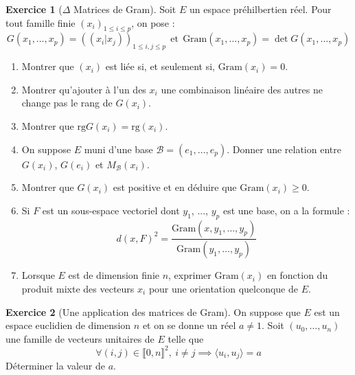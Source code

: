 \documentclass[french]{book}
\theoremstyle{definition}
\newtheorem{ex}{Exercice}[chapter]
\theoremstyle{theorem}
\theoremstyle{remark}
\begin{document}
\begin{ex}[$\Delta$ Matrices de Gram] Soit $E$ un espace préhilbertien réel. Pour tout famille finie $(x_i)_{1\leqslant i\leqslant p}$, on pose : $$G(x_1,\ldots,x_p)=((x_i|x_j))_{1\leqslant i,j\leqslant p}\ \ \text{et} \ \ \text{Gram}(x_1,\ldots,x_p)=\det G(x_1,\ldots,x_p)$$
	\begin{enumerate}
		\item Montrer que $(x_i)$ est liée si, et seulement si, $\text{Gram}(x_i)=0$.
		\item Montrer qu'ajouter à l'un des $x_i$ une combinaison linéaire des autres ne change pas le rang de $G(x_i)$.
		\item Montrer que $\text{rg}G(x_i)=\text{rg}(x_i)$.
		\item On suppose $E$ muni d'une base $\mathcal{B}=(e_1,\ldots,e_p)$. Donner une relation entre $G(x_i)$, $G(e_i)$ et $M_\mathcal{B}(x_i)$.
		\item Montrer que $G(x_i)$ est positive et en déduire que $\text{Gram}(x_i)\geqslant0$.
		\item Si $F$ est un sous-espace vectoriel dont $y_1$, ..., $y_p$ est une base, on a la formule : $$d(x,F)^2=\frac{\text{Gram}(x,y_1,\ldots,y_p)}{\text{Gram}(y_1,\ldots,y_p)}$$
		\item Lorsque $E$ est de dimension finie $n$, exprimer $\text{Gram}(x_i)$ en fonction du produit mixte des vecteurs $x_i$ pour une orientation quelconque de $E$.
	\end{enumerate}
\end{ex}

\begin{ex}[Une application des matrices de Gram]
	On suppose que $E$ est un espace euclidien de dimension $n$ et on se donne un réel $a\ne 1$. Soit $(u_0,\ldots,u_n)$ une famille de vecteurs unitaires de $E$ telle que $$\forall (i,j)\in\llbracket0,n\rrbracket^2,\ i\ne j\implies\langle u_i,u_j\rangle =a$$ Déterminer la valeur de $a$.
\end{ex}
\end{document}
